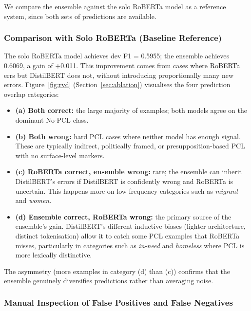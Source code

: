 \documentclass[11pt]{article}
\begin{document}
We compare the ensemble against the solo RoBERTa model as a reference system, since both sets of predictions are available.

\subsubsection*{Comparison with Solo RoBERTa (Baseline Reference)}

The solo RoBERTa model achieves dev F1 = 0.5955; the ensemble achieves 0.6069, a gain of $+$0.011. This improvement comes from cases where RoBERTa errs but DistilBERT does not, without introducing proportionally many new errors. Figure~\ref{fig:rvd} (Section~\ref{sec:ablation}) visualises the four prediction overlap categories:

\begin{itemize}[noitemsep]
    \item \textbf{(a) Both correct:} the large majority of examples; both models agree on the dominant No-PCL class.
    \item \textbf{(b) Both wrong:} hard PCL cases where neither model has enough signal. These are typically indirect, politically framed, or presupposition-based PCL with no surface-level markers.
    \item \textbf{(c) RoBERTa correct, ensemble wrong:} rare; the ensemble can inherit DistilBERT's errors if DistilBERT is confidently wrong and RoBERTa is uncertain. This happens more on low-frequency categories such as \textit{migrant} and \textit{women}.
    \item \textbf{(d) Ensemble correct, RoBERTa wrong:} the primary source of the ensemble's gain. DistilBERT's different inductive biases (lighter architecture, distinct tokenisation) allow it to catch some PCL examples that RoBERTa misses, particularly in categories such as \textit{in-need} and \textit{homeless} where PCL is more lexically distinctive.
\end{itemize}

The asymmetry (more examples in category (d) than (c)) confirms that the ensemble genuinely diversifies predictions rather than averaging noise.

\subsubsection*{Manual Inspection of False Positives and False Negatives}
\end{document}
